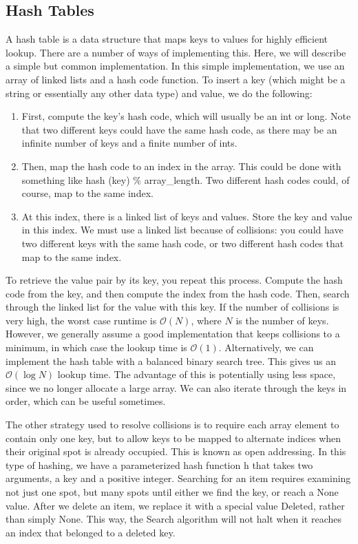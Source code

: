 \documentclass{article}
\newcommand{\bigO}{\ensuremath{\mathcal{O}}}
\begin{document}
    \subsection{Hash Tables}
    A hash table is a data structure that maps keys to values for highly efficient lookup. There are a number of ways of implementing this. Here, we will describe a simple but common implementation. In this simple implementation, we use an array of linked lists and a hash code function. To insert a key (which might be a string or essentially any other data type) and value, we do the following: 
    \begin{enumerate}
        \item 
        First, compute the key's hash code, which will usually be an int or long. Note that two different keys could have the same hash code, as there may be an infinite number of keys and a finite number of ints.
        \item
        Then, map the hash code to an index in the array. This could be done with something like hash (key) \% array\_length. Two different hash codes could, of course, map to the same index.
        \item
        At this index, there is a linked list of keys and values. Store the key and value in this index. We must use a linked list because of collisions: you could have two different keys with the same hash code, or two different hash codes that map to the same index.
    \end{enumerate}
    To retrieve the value pair by its key, you repeat this process. Compute the hash code from the key, and then compute the index from the hash code. Then, search through the linked list for the value with this key. If the number of collisions is very high, the worst case runtime is $\bigO(N)$, where $N$ is the number of keys. However, we generally assume a good implementation that keeps collisions to a minimum, in which case the lookup time is $\bigO(1)$. Alternatively, we can implement the hash table with a balanced binary search tree. This gives us an $\bigO(\log N)$ lookup time. The advantage of this is potentially using less space, since we no longer allocate a large array. We can also iterate through the keys in order, which can be useful sometimes.

    The other strategy used to resolve collisions is to require each array element to contain only one key, but to allow keys to be mapped to alternate indices when their original spot is already occupied. This is known as open addressing. In this type of hashing, we have a parameterized hash function h that takes two arguments, a key and a positive integer. Searching for an item requires examining not just one spot, but many spots until either we find the key, or reach a None value. After we delete an item, we replace it with a special value Deleted, rather than simply None. This way, the Search algorithm will not halt when it reaches an index that belonged to a deleted key.
    
\end{document}
